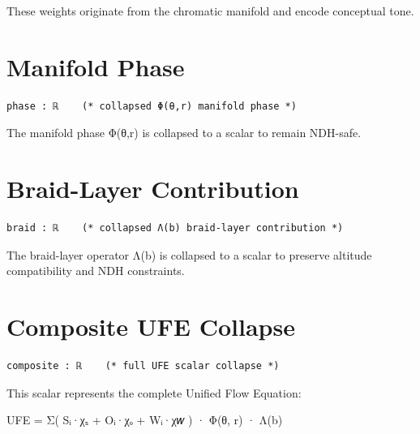 \documentclass[11pt]{article}
\begin{document}
These weights originate from the chromatic manifold and encode conceptual tone.

\newpage


\section{Manifold Phase}

\begin{verbatim}
phase : ℝ    (* collapsed Φ(θ,r) manifold phase *)
\end{verbatim}

The manifold phase Φ(θ,r) is collapsed to a scalar to remain NDH-safe.

\newpage


\section{Braid-Layer Contribution}

\begin{verbatim}
braid : ℝ    (* collapsed Λ(b) braid-layer contribution *)
\end{verbatim}

The braid-layer operator Λ(b) is collapsed to a scalar to preserve altitude
compatibility and NDH constraints.

\newpage


\section{Composite UFE Collapse}

\begin{verbatim}
composite : ℝ    (* full UFE scalar collapse *)
\end{verbatim}

This scalar represents the complete Unified Flow Equation:

UFE = Σ( Sᵢ·χₛ + Oᵢ·χₒ + Wᵢ·χ𝑤 ) · Φ(θ, r) · Λ(b)
\end{document}
